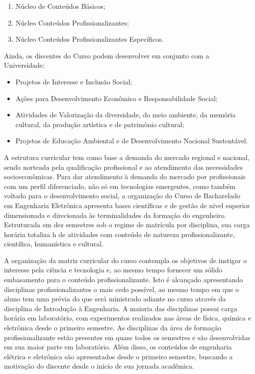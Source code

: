 \begin{enumerate}
	\item 	Núcleo de Conteúdos Básicos;
	\item 	Núcleo Conteúdos Profissionalizantes;
	\item 	Núcleo Conteúdos Profissionalizantes Específicos.
\end{enumerate}

Ainda, os discentes do Curso podem desenvolver em conjunto com a Universidade:

\begin{itemize}
	\item 	Projetos de Interesse e Inclusão Social;
	\item	Ações para Desenvolvimento Econômico e Responsabilidade Social;
	\item	Atividades de Valorização da diversidade, do meio ambiente, da memória cultural, da produção artística e de patrimônio cultural;
	\item	Projetos de Educação Ambiental e de Desenvolvimento Nacional Sustentável.
\end{itemize}

A estrutura curricular tem como base a demanda do mercado regional e nacional, sendo norteada pela qualificação profissional e ao atendimento das necessidades socioeconômicas. Para dar atendimento à demanda do mercado por profissionais com um perfil diferenciado, não só em tecnologias emergentes, como também voltado para o desenvolvimento social, a organização do Curso de Bacharelado em Engenharia Eletrônica apresenta bases científicas e de gestão de nível superior dimensionada e direcionada às terminalidades da formação do engenheiro. Estruturada em dez semestres sob o regime de matrícula por disciplina, sua carga horária totaliza \the\value{horasT} h de atividades com conteúdo de natureza profissionalizante, científica, humanística e cultural.

A organização da matriz curricular do curso contempla os objetivos de instigar o interesse pela ciência e tecnologia e, ao mesmo tempo fornecer um sólido embasamento para o conteúdo profissionalizante. Isto é alcançado apresentando disciplinas profissionalizantes o mais cedo possível, ao mesmo tempo em que o aluno tem uma prévia do que será ministrado adiante no curso através da disciplina de Introdução à Engenharia. A maioria das disciplinas possui carga horária em laboratório, com experimentos realizados nas áreas de física, química e eletrônica desde o primeiro semestre. As disciplinas da área de formação profissionalizante estão presentes em quase todos os semestres e são desenvolvidas em sua maior parte em laboratório. Além disso, os conteúdos de engenharia elétrica e eletrônica são apresentados desde o primeiro semestre, buscando a motivação do discente desde o início de sua jornada acadêmica.

